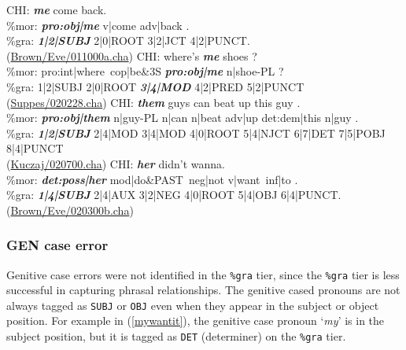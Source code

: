 \begin{exe}
\ex \label{666}\gll *CHI: \textit{\textbf{me}} come back.\\
\%mor: \textit{\textbf{pro:obj|me}} v|come adv|back .\\
\%gra: \textit{\textbf{1|2|SUBJ}} 2|0|ROOT 3|2|JCT 4|2|PUNCT. \\
(\href{https://childes.talkbank.org/browser/index.php?url=Eng-NA/Brown/Eve/011000a.cha}{Brown/Eve/011000a.cha})
\ex \label{meshoew} \gll *CHI:	where's \textbf{\textit{me}} shoes ?\\
\%mor:	pro:int|where~cop|be&3S \textit{\textbf{pro:obj|me}} n|shoe-PL ?\\
\%gra:	1|2|SUBJ 2|0|ROOT \textbf{\textit{3|4|MOD}} 4|2|PRED 5|2|PUNCT\\
(\href{https://childes.talkbank.org/browser/index.php?url=Eng-NA/Suppes/020228.cha}{Suppes/020228.cha})
\ex \label{them} \gll *CHI:	\textbf{\textit{them}} guys can beat up this guy .\\
\%mor:	\textit{\textbf{pro:obj|them}} n|guy-PL n|can n|beat adv|up det:dem|this n|guy .\\
\%gra:\textbf{\textit{	1|2|SUBJ} }2|4|MOD 3|4|MOD 4|0|ROOT 5|4|NJCT 6|7|DET 7|5|POBJ 8|4|PUNCT\\
(\href{https://childes.talkbank.org/browser/index.php?url=Eng-NA/Kuczaj/020700.cha}{Kuczaj/020700.cha})
\ex \label{herdidnt}\gll *CHI: \textit{\textbf{her}} didn't wanna.\\
\%mor: \textbf{\textit{det:poss|her}} mod|do&PAST~neg|not v|want~inf|to .\\
\%gra:	\textit{\textbf{1|4|SUBJ}} 2|4|AUX 3|2|NEG 4|0|ROOT 5|4|OBJ 6|4|PUNCT. \\
(\href{https://childes.talkbank.org/browser/index.php?url=Eng-NA/Brown/Eve/020300b.cha}{Brown/Eve/020300b.cha})
\end{exe}


\subsubsection{GEN case error}
Genitive case errors were not identified in the \texttt{\%gra} tier, since the \texttt{\%gra} tier is less successful in capturing phrasal relationships. The genitive cased pronouns are not always tagged as \texttt{SUBJ} or \texttt{OBJ} even when they appear in the subject or object position. For example in (\ref{mywantit}), the genitive case pronoun `\textit{my}' is in the subject position, but it is tagged as \texttt{DET} (determiner) on the \texttt{\%gra} tier. 

